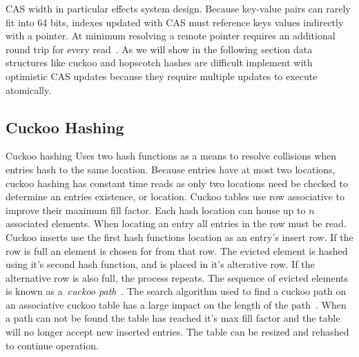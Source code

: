 CAS width in particular effects system design.  Because
key-value pairs can rarely fit into 64 bits, indexes updated
with CAS must reference keys values indirectly with a
pointer. At minimum resolving a remote pointer requires an
additional round trip for every read~\cite{race,clover}.
As we will show in the following section data structures
like cuckoo and hopscotch hashes are difficult implement with
optimistic CAS updates because they require multiple updates
to execute atomically.


\subsection{Cuckoo Hashing}
Cuckoo hashing Uses two hash functions as a means
to resolve collisions when entries hash to the same
location. Because entries have at most two locations, cuckoo
hashing has constant time reads as only two locations need
be checked to determine an entries existence, or location.
Cuckoo tables use row associative to improve their maximum
fill factor. Each hash location can house up to $n$
associated elements. When locating an entry all entries in
the row must be read.  Cuckoo inserts use the first hash
functions location as an entry's insert row. If the row is
full an element is chosen for from that row. The evicted
element is hashed using it's second hash function, and is
placed in it's alterative row. If the alternative row is
also full, the process repeats. The sequence of evicted
elements is known as a~\textit{cuckoo
path}~\cite{cuckoo,memc3,cuckoo-improvements}. The search
algorithm used to find a cuckoo path on an associative
cuckoo table has a large impact on the length of the
path~\cite{cuckoo-improvements}. When a path can not be
found the table has reached it's max fill factor and the
table will no longer accept new inserted entries. The table
can be resized and rehashed to continue operation.

